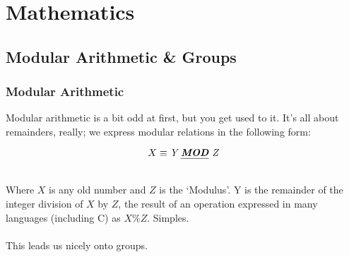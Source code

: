 
\chapter{Mathematics}
    \section{Modular Arithmetic \& Groups}
    \subsection{Modular Arithmetic}
    Modular arithmetic is a bit odd at first, but you get used to it. It's all about remainders, really; we express modular relations in the following form:\\
    \begin{figure}
    \centering
        $$
        X \equiv \textit{Y \emph{\textbf{MOD}} Z}
        $$
    \end{figure}\\
    
    Where $X$ is any old number and $Z$ is the `Modulus'. Y is the remainder of the integer division of $X$ by $Z$, the result of an operation expressed in many languages (including C) as $X \% Z$. Simples.\\
    \\
    This leads us nicely onto groups.

